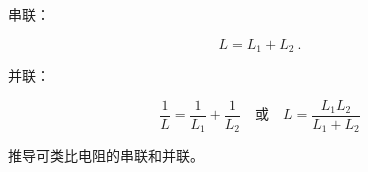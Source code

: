 
\begin{issues}
\issueDraft
\end{issues}


串联：

\begin{equation}
L = L_1 + L_2~.
\end{equation}

并联：

\begin{equation}
\frac{1}{L} = \frac{1}{L_1} + \frac{1}{L_2}
\quad \text{或} \quad
L = \frac{L_1L_2}{L_1 + L_2}
\end{equation}

推导可类比电阻的串联和并联。
